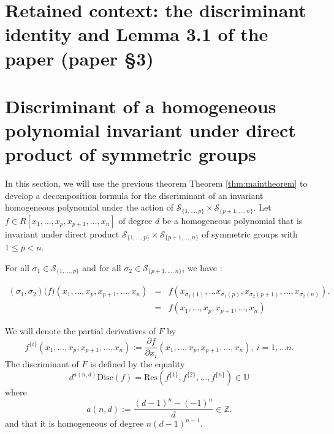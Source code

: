 \documentclass[10pt,a4paper]{amsart}
\newcommand{\Res}{\mathrm{Res}}
\newcommand{\Disc}{\mathrm{Disc}}
\newcommand{\UU}{\mathbb{U}}
\newcommand{\ZZ}{\mathbb{Z}}
\begin{document}
\section*{Retained context: the discriminant identity and Lemma 3.1 of the paper (paper \S3)}
\section{Discriminant of a homogeneous polynomial invariant under direct product of symmetric groups }\label{sec:discriminant}

In this section, we will use the previous theorem  Theorem {\ref{thm:maintheorem}} to  develop  a decomposition formula for the discriminant of an invariant homogeneous polynomial under the action of  $\mathcal{S}_{\{1
,\ldots,p\}}\times\mathcal{S}_{\{p+1
,\ldots,n\}}.$ 
Let $f \in R[x_1,\ldots,x_p,x_{p+1},\ldots,x_n]$ of degree $d$ be a homogeneous polynomial that is invariant under direct product  $\mathcal{S}_{\{1
,\ldots,p\}}\times\mathcal{S}_{\{p+1
,\ldots,n\}} $ of symmetric groups with $1\leq p< n$.

For all $\sigma_1\in \mathcal{S}_{\{1
,\ldots,p\}}$ and for all $\sigma_2\in \mathcal{S}_{\{p+1
,\ldots,n\}}$, we have :


\begin{eqnarray}
(\sigma_1,\sigma_2)\Big(f \Big)(x_1,\ldots,x_p,x_{p+1},\ldots,x_n) &=&f(x_{\sigma_1(1)},\ldots x_{\sigma_1(p)},x_{\sigma_2(p+1)},\ldots,x_{\sigma_2(n)}). \\
 &=& f(x_1,\ldots,x_p,x_{p+1},\ldots,x_n)
\end{eqnarray}

We  will denote the partial derivatives of $F$ by
$$f^{\{i\}}(x_1,\ldots,x_p,x_{p+1},\ldots,x_n):=\frac{\partial f}{\partial x_{i}} (x_1,\ldots,x_p,x_{p+1},\ldots,x_n), \ i=1,\ldots n .$$ 
The discriminant of $F$ is defined by the equality
\begin{equation}\label{eq:discressym}
d^{a(n,d)}\Disc(f)=\Res\left(  f^{\{1\}},f^{\{2\}},\ldots,f^{\{n\}} \right) \in \UU
\end{equation} where 
$$a(n,d):=\frac{(d-1)^{n}-(-1)^{n}}{d} \in \ZZ.$$
and that it is homogeneous of degree $n(d-1)^{n-1}$.
\end{document}
